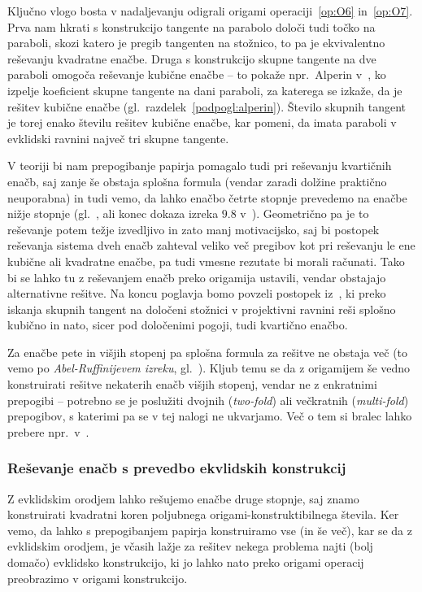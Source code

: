 Ključno vlogo bosta v nadaljevanju odigrali origami operaciji~\ref{op:O6} in~\ref{op:O7}. Prva nam hkrati s konstrukcijo tangente na parabolo določi tudi točko na paraboli, skozi katero je pregib tangenten na stožnico, to pa je ekvivalentno reševanju kvadratne enačbe. Druga s konstrukcijo skupne tangente na dve paraboli omogoča reševanje kubične enačbe -- to pokaže npr.\ Alperin v~\cite[str.\ 129]{alperin2000}, ko izpelje koeficient skupne tangente na dani paraboli, za katerega se izkaže, da je rešitev kubične enačbe (gl.\ razdelek~\ref{podpogl:alperin}). Število skupnih tangent je torej enako številu rešitev kubične enačbe, kar pomeni, da imata paraboli v evklidski ravnini največ tri skupne tangente.

V teoriji bi nam prepogibanje papirja pomagalo tudi pri reševanju kvartičnih enačb, saj zanje še obstaja splošna formula (vendar zaradi dolžine praktično neuporabna) in tudi vemo, da lahko enačbo četrte stopnje prevedemo na enačbe nižje stopnje (gl.\ \cite{quartics2012}, \cite{wikiquartic} ali konec dokaza izreka $9.8$ v~\cite[str.\ 134]{geometricconstructions}). Geometrično pa je to reševanje potem težje izvedljivo in zato manj motivacijsko, saj bi postopek reševanja sistema dveh enačb zahteval veliko več pregibov kot pri reševanju le ene kubične ali kvadratne enačbe, pa tudi vmesne rezutate bi morali računati. Tako bi se lahko tu z reševanjem enačb preko origamija ustavili, vendar obstajajo alternativne rešitve. Na koncu poglavja bomo povzeli postopek iz~\cite{edwards2001}, ki preko iskanja skupnih tangent na določeni stožnici v projektivni ravnini reši splošno kubično in nato, sicer pod določenimi pogoji, tudi kvartično enačbo.

Za enačbe pete in višjih stopenj pa splošna formula za rešitve ne obstaja več (to vemo po \emph{Abel-Ruffinijevem izreku}, gl.\ \cite{mrinal2019}). Kljub temu se da z origamijem še vedno konstruirati rešitve nekaterih enačb višjih stopenj, vendar ne z enkratnimi prepogibi -- potrebno se je poslužiti dvojnih (\emph{two-fold}) ali večkratnih (\emph{multi-fold}) prepogibov, s katerimi pa se v tej nalogi ne ukvarjamo. Več o tem si bralec lahko prebere npr.\ v~\cite{langalperin2009}.

\subsubsection*{Reševanje enačb s prevedbo ekvlidskih konstrukcij}

Z evklidskim orodjem lahko rešujemo enačbe druge stopnje, saj znamo konstruirati kvadratni koren poljubnega origami-konstruktibilnega števila. Ker vemo, da lahko s prepogibanjem papirja konstruiramo vse (in še več), kar se da z evklidskim orodjem, je včasih lažje za rešitev nekega problema najti (bolj domačo) evklidsko konstrukcijo, ki jo lahko nato preko origami operacij preobrazimo v origami konstrukcijo.

